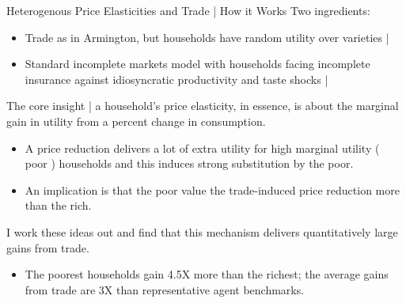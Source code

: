 \documentclass[9pt,pdftex,aspectratio=1610]{beamer}
\theoremstyle{definition}
\begin{document}
\begin{frame}[t]{Heterogenous Price Elasticities and Trade | How it Works}
Two ingredients:
\begin{itemize}
\item Trade as in Armington, but households have random utility over varieties | \citet{mcfadden1974frontiers}
\smallskip
\item Standard incomplete markets model with households facing incomplete insurance against idiosyncratic productivity and taste shocks | \citet{bewley1979optimum}
\end{itemize}
\bigskip
The core insight | a household's price elasticity, in essence, is about the marginal gain in utility from a percent change in consumption.
\begin{itemize}
\item A price reduction delivers a lot of extra utility for high marginal utility ( poor ) households and this induces strong substitution by the poor.
\smallskip
\item An implication is that the poor value the trade-induced price reduction more than the rich.
\end{itemize}
\bigskip
I work these ideas out and find that this mechanism delivers quantitatively large gains from trade.
\begin{itemize}
\item The poorest households gain 4.5X more than the richest; the average gains from trade are 3X than representative agent benchmarks.
\end{itemize}
%

\end{frame}
\end{document}

